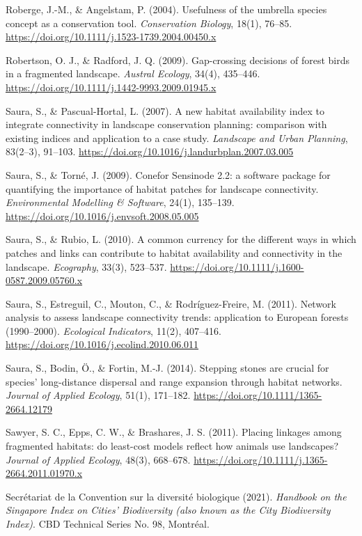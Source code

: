\documentclass[a4paper,11pt]{report}
\begin{document}
Roberge, J.-M., \& Angelstam, P. (2004). Usefulness of the umbrella species concept as a conservation tool. \textit{Conservation Biology}, 18(1), 76--85. \url{https://doi.org/10.1111/j.1523-1739.2004.00450.x}

Robertson, O. J., \& Radford, J. Q. (2009). Gap-crossing decisions of forest birds in a fragmented landscape. \textit{Austral Ecology}, 34(4), 435--446. \url{https://doi.org/10.1111/j.1442-9993.2009.01945.x}

Saura, S., \& Pascual-Hortal, L. (2007). A new habitat availability index to integrate connectivity in landscape conservation planning: comparison with existing indices and application to a case study. \textit{Landscape and Urban Planning}, 83(2--3), 91--103. \url{https://doi.org/10.1016/j.landurbplan.2007.03.005}

Saura, S., \& Torné, J. (2009). Conefor Sensinode 2.2: a software package for quantifying the importance of habitat patches for landscape connectivity. \textit{Environmental Modelling \& Software}, 24(1), 135--139. \url{https://doi.org/10.1016/j.envsoft.2008.05.005}

Saura, S., \& Rubio, L. (2010). A common currency for the different ways in which patches and links can contribute to habitat availability and connectivity in the landscape. \textit{Ecography}, 33(3), 523--537. \url{https://doi.org/10.1111/j.1600-0587.2009.05760.x}

Saura, S., Estreguil, C., Mouton, C., \& Rodríguez-Freire, M. (2011). Network analysis to assess landscape connectivity trends: application to European forests (1990--2000). \textit{Ecological Indicators}, 11(2), 407--416. \url{https://doi.org/10.1016/j.ecolind.2010.06.011}

Saura, S., Bodin, Ö., \& Fortin, M.-J. (2014). Stepping stones are crucial for species' long-distance dispersal and range expansion through habitat networks. \textit{Journal of Applied Ecology}, 51(1), 171--182. \url{https://doi.org/10.1111/1365-2664.12179}

Sawyer, S. C., Epps, C. W., \& Brashares, J. S. (2011). Placing linkages among fragmented habitats: do least-cost models reflect how animals use landscapes? \textit{Journal of Applied Ecology}, 48(3), 668--678. \url{https://doi.org/10.1111/j.1365-2664.2011.01970.x}

Secrétariat de la Convention sur la diversité biologique (2021). \textit{Handbook on the Singapore Index on Cities' Biodiversity (also known as the City Biodiversity Index)}. CBD Technical Series No. 98, Montréal.
\end{document}

